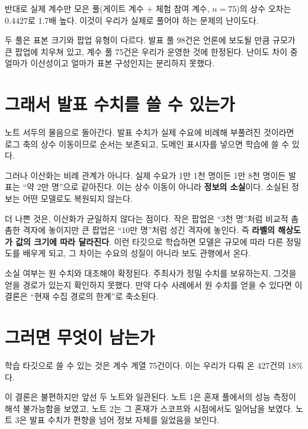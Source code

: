 \documentclass[10pt]{article}
\begin{document}
반대로 실제 계수만 모은 풀(게이트 계수 + 체험 참여 계수, $n{=}75$)의 상수 오차는
$0.4427$로 1.7배 높다. 이것이 우리가 실제로 풀어야 하는 문제의 난이도다.

{두 풀은 표본 크기와 팝업 유형이 다르다. 발표 풀 98건은 언론에 보도될 만큼 규모가 큰
팝업에 치우쳐 있고, 계수 풀 75건은 우리가 운영한 것에 한정된다. 난이도 차이 중 얼마가
이산성이고 얼마가 표본 구성인지는 분리하지 못했다.}

\section{그래서 발표 수치를 쓸 수 있는가}

노트 서두의 물음으로 돌아간다. 발표 수치가 실제 수요에 비례해 부풀려진 것이라면
로그 축의 상수 이동이므로 순서는 보존되고, 도메인 표시자를 넣으면 학습에 쓸 수 있다.

그러나 이산화는 비례 관계가 아니다. 실제 수요가 1만 1천 명이든 1만 8천 명이든 발표는
``약 2만 명''으로 같아진다. 이는 상수 이동이 아니라 \textbf{정보의 소실}이다.
소실된 정보는 어떤 모델로도 복원되지 않는다.

더 나쁜 것은, 이산화가 균일하지 않다는 점이다. 작은 팝업은 ``3천 명''처럼 비교적 촘촘한
격자에 놓이지만 큰 팝업은 ``10만 명''처럼 성긴 격자에 놓인다. 즉 \textbf{라벨의 해상도가
값의 크기에 따라 달라진다}. 이런 타깃으로 학습하면 모델은 규모에 따라 다른 정밀도를
배우게 되고, 그 차이는 수요의 성질이 아니라 보도 관행에서 온다.

{소실 여부는 원 수치와 대조해야 확정된다. 주최사가 정밀 수치를 보유하는지, 그것을
얻을 경로가 있는지 확인하지 못했다. 만약 다수 사례에서 원 수치를 얻을 수 있다면
이 결론은 ``현재 수집 경로의 한계''로 축소된다.}

\section{그러면 무엇이 남는가}

학습 타깃으로 쓸 수 있는 것은 계수 계열 75건이다. 이는 우리가 다뤄 온 427건의 18\%다.

이 결론은 불편하지만 앞선 두 노트와 일관된다. 노트 1은 혼재 풀에서의 성능 측정이
해석 불가능함을 보였고, 노트 2는 그 혼재가 스코프와 시점에서도 일어남을 보였다.
노트 3은 발표 수치가 편향을 넘어 정보 자체를 잃었음을 보인다.
\end{document}
